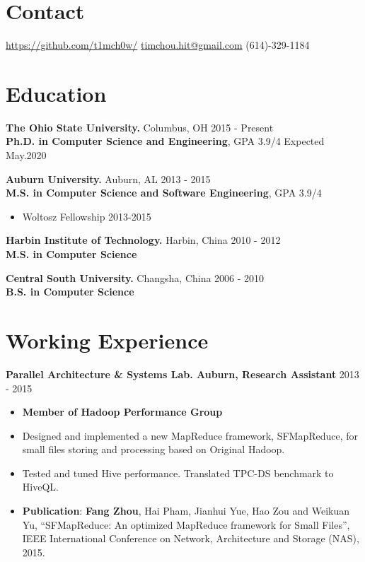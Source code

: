 \documentclass[11pt,margin,line]{res}
\newcommand{\bulletindent}{11pt}
\begin{document}

\begin{resume}

\section{Contact}
\href{github.com/t1mch0w/}{https://github.com/t1mch0w/}
\hfill \href{mailto:timchou.hit@gmail.com}{timchou.hit@gmail.com} \hfill (614)-329-1184  %

\section{Education}
{\bf The Ohio State University.} Columbus, OH       \hfill 2015 - Present\\
{\bf Ph.D. in Computer Science and Engineering}, GPA 3.9/4  \hfill Expected May.2020

{\bf Auburn University.} Auburn, AL \hfill 2013 - 2015\\
{\bf M.S. in Computer Science and Software Engineering}, GPA 3.9/4 
\begin{itemize}[leftmargin=\bulletindent]
	\itemsep -2pt
    \item Woltosz Fellowship 2013-2015 
\end{itemize}

{\bf Harbin Institute of Technology.} Harbin, China \hfill 2010 - 2012\\
{\bf M.S. in Computer Science} 

{\bf Central South University.} Changsha, China \hfill 2006 - 2010\\
{\bf B.S. in Computer Science} 

\section{Working Experience}
{\bf Parallel Architecture \& Systems Lab. Auburn, Research Assistant}   \hfill 2013 - 2015
    \begin{itemize}[leftmargin=\bulletindent]
        \itemsep -2pt
        \item {\bf Member of Hadoop Performance Group}
        \item Designed and implemented a new MapReduce framework, SFMapReduce, for small files storing and processing based on Original Hadoop.
        \item Tested and tuned Hive performance. Translated TPC-DS benchmark to HiveQL. 
        \item {\bf Publication}: {\bf Fang Zhou}, Hai Pham, Jianhui Yue, Hao Zou and Weikuan Yu, ``SFMapReduce: An optimized MapReduce framework for Small Files'', IEEE International Conference on Network, Architecture and Storage (NAS), 2015.
    \end{itemize}


\end{resume}
\end{document}
